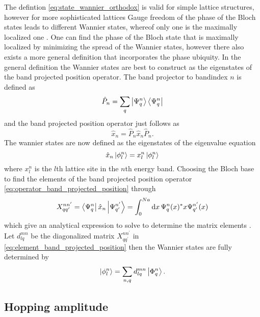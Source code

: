 The defintion \cref{eq:state_wannier_orthodox} is valid for simple lattice
structures, however for more sophisticated lattices Gauge freedom of the
phase of the Bloch states leads to different Wannier states, whereof only
one is the maximally localized one \cite{Goerg2014}. One can find the
phase of the Bloch state that is maximally localized by minimizing the spread
of the Wannier states, however there also exists a more general definition
that incorporates the phase ubiquity. In the general definition the Wannier
states are best to construct as the eigenstates of the band projected
position operator. The band projector to bandindex $n$ is defined as
\begin{equation}
  \hat{P}_n
  =\sum_q\ket{\Psi^n_q}\bra{\Psi^n_q}
  \label{eq:operator_band_projector}
\end{equation}
and the band projected position operator just follows as
\begin{equation}
  \hat{x}_n
  =\hat{P}_n\hat{x}_n\hat{P}_n
  \label{eq:operator_band_projected_position}.
\end{equation}
The wannier states are now defined as the eigenstates of the eigenvalue
equation
\begin{equation}
  \hat{x}_n\ket{\phi^n_l}=x^n_l\ket{\phi^n_l}
  \label{eq:eigenvalue_band_projected_position}
\end{equation}
where $x^n_l$ is the $l$th lattice site in the $n$th energy band. Choosing
the Bloch base to find the elements of the band projected position operator
\cref{eq:operator_band_projected_position} through
\begin{equation}
  X^{nn^\prime}_{qq^\prime}
  =\bra{\Psi^n_q}\hat{x}_n\ket{\Psi^{n^\prime}_{q^\prime}}
  =\int_0^{Na}\dd{x}\Psi^n_q(x)^*x\Psi^{n^\prime}_{q^\prime}(x)
  \label{eq:element_band_projected_position}
\end{equation}
which give an analytical expression to solve to determine the matrix elements
\cite{Bissbort2013}. Let $d^{mn}_{lq}$ be the diagonalized
matrix $X^{nn^\prime}_{qq^\prime}$ in
\cref{eq:element_band_projected_position} then the Wannier states are fully
determined by
\begin{equation}
  \ket{\phi^n_l}
  =\sum_{n,q}d^{mn}_{lq}\ket{\Phi^n_q}
  \label{eq:state_wannier}.
\end{equation}

\subsection{Hopping amplitude}

